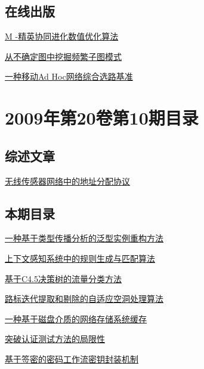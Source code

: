\documentclass[a4paper]{article}
\begin{document}
\subsection{在线出版}
\href{http://www.jos.org.cn/ch/reader/download_pdf.aspx?file_no=3496&year_id=2009&quarter_id=11&falg=1}{M -精英协同进化数值优化算法}

\href{http://www.jos.org.cn/ch/reader/download_pdf.aspx?file_no=3473&year_id=2009&quarter_id=11&falg=1}{从不确定图中挖掘频繁子图模式}

\href{http://www.jos.org.cn/ch/reader/download_pdf.aspx?file_no=581&year_id=2009&quarter_id=11&falg=1}{一种移动Ad Hoc网络综合选路基准}


\section{\textbf{2009年第20卷第10期目录}}
\subsection{综述文章}
\href{http://www.jos.org.cn/ch/reader/download_pdf.aspx?file_no=3631&year_id=2009&quarter_id=10&falg=1}{无线传感器网络中的地址分配协议}

\subsection{本期目录}
\href{http://www.jos.org.cn/ch/reader/download_pdf.aspx?file_no=3656&year_id=2009&quarter_id=10&falg=1}{一种基于类型传播分析的泛型实例重构方法}

\href{http://www.jos.org.cn/ch/reader/download_pdf.aspx?file_no=3436&year_id=2009&quarter_id=10&falg=1}{上下文感知系统中的规则生成与匹配算法}

\href{http://www.jos.org.cn/ch/reader/download_pdf.aspx?file_no=3444&year_id=2009&quarter_id=10&falg=1}{基于C4.5决策树的流量分类方法}

\href{http://www.jos.org.cn/ch/reader/download_pdf.aspx?file_no=3628&year_id=2009&quarter_id=10&falg=1}{路标迭代提取和剔除的自适应空洞处理算法}

\href{http://www.jos.org.cn/ch/reader/download_pdf.aspx?file_no=3427&year_id=2009&quarter_id=10&falg=1}{一种基于磁盘介质的网络存储系统缓存}

\href{http://www.jos.org.cn/ch/reader/download_pdf.aspx?file_no=3310&year_id=2009&quarter_id=10&falg=1}{突破认证测试方法的局限性}

\href{http://www.jos.org.cn/ch/reader/download_pdf.aspx?file_no=3426&year_id=2009&quarter_id=10&falg=1}{基于签密的密码工作流密钥封装机制}
\end{document}
